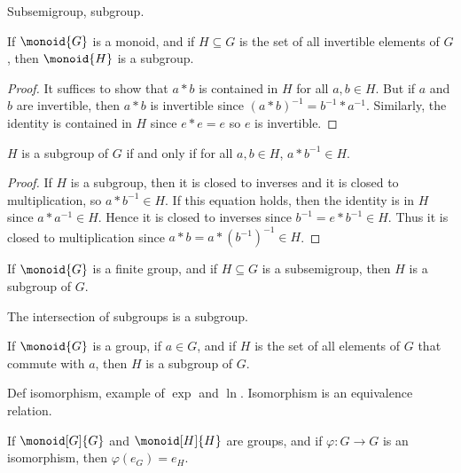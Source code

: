 \documentclass{article}                                                        %
\begin{document}
            Subsemigroup, subgroup.
            \begin{theorem}
                If $\monoid{G}$ is a monoid, and if $H\subseteq{G}$ is the set
                of all invertible elements of $G$, then $\monoid{H}$ is a
                subgroup.
            \end{theorem}
            \begin{proof}
                It suffices to show that $a*b$ is contained in $H$ for all
                $a,b\in{H}$. But if $a$ and $b$ are invertible, then $a*b$ is
                invertible since
                $(a*b)^{\minus{1}}=b^{\minus{1}}*a^{\minus{1}}$. Similarly, the
                identity is contained in $H$ since $e*e=e$ so $e$ is invertible.
            \end{proof}
            \begin{theorem}
                $H$ is a subgroup of $G$ if and only if for all $a,b\in{H}$,
                $a*b^{\minus{1}}\in{H}$.
            \end{theorem}
            \begin{proof}
                If $H$ is a subgroup, then it is closed to inverses and it is
                closed to multiplication, so $a*b^{\minus{1}}\in{H}$. If this
                equation holds, then the identity is in $H$ since
                $a*a^{\minus{1}}\in{H}$. Hence it is closed to inverses since
                $b^{\minus{1}}=e*b^{\minus{1}}\in{H}$. Thus it is closed to
                multiplication since $a*b=a*(b^{\minus{1}})^{\minus{1}}\in{H}$.
            \end{proof}
            \begin{theorem}
                If $\monoid{G}$ is a finite group, and if $H\subseteq{G}$ is a
                subsemigroup, then $H$ is a subgroup of $G$.
            \end{theorem}
            \begin{theorem}
                The intersection of subgroups is a subgroup.
            \end{theorem}
            \begin{theorem}
                If $\monoid{G}$ is a group, if $a\in{G}$, and if $H$ is the set
                of all elements of $G$ that commute with $a$, then $H$ is a
                subgroup of $G$.
            \end{theorem}
            Def isomorphism, example of $\exp$ and $\ln$. Isomorphism is an
            equivalence relation.
            \begin{theorem}
                If $\monoid[G]{G}$ and $\monoid[H]{H}$ are groups, and if
                $\varphi:G\rightarrow{G}$ is an isomorphism, then
                $\varphi(e_{G})=e_{H}$.
            \end{theorem}
\end{document}
